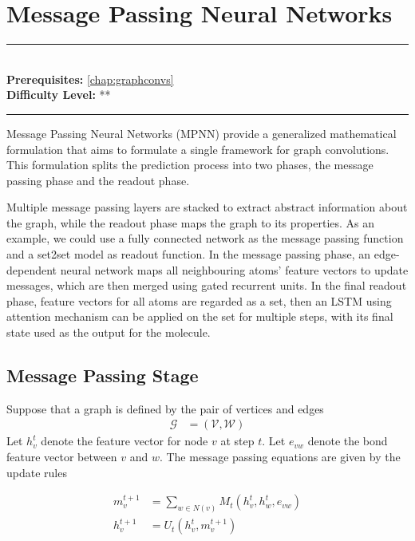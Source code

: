 \documentclass[book.tex]{subfiles}
\begin{document}
\chapter{Message Passing Neural Networks}

\label{chap:mpnn}
\noindent\rule{11cm}{0.4pt} \\
\textbf{Prerequisites:} \autoref{chap:graphconvs} \\
\textbf{Difficulty Level:} ** \\
\noindent\rule{11cm}{0.4pt}
\vspace{5mm}

Message Passing Neural Networks (MPNN) provide a generalized mathematical formulation \cite{gilmer2017neural} that aims to formulate a single framework for graph convolutions. This formulation splits the prediction process into two phases, the message passing phase and the readout phase. 

Multiple message passing layers are stacked to extract abstract information about the graph, while  the readout phase maps the graph to its properties. As an example, we could use a fully connected network as the message passing function and a set2set model as readout function. In the message passing phase, an edge-dependent neural network maps all neighbouring atoms' feature vectors to update messages, which are then merged using gated recurrent units. In the final readout phase, feature vectors for all atoms are regarded as
a set, then an LSTM using attention mechanism can be applied on the set for multiple steps, with its final state used as the output for the molecule.


\section{Message Passing Stage}

Suppose that a graph is defined by the pair of vertices and edges
\begin{align}
\mathcal{G} &= (\mathcal{V}, \mathcal{W})
\end{align}
Let $h_v^t$ denote the feature vector for node $v$ at step $t$. Let $e_{vw}$ denote the bond feature vector between $v$ and $w$. The message passing equations are given by the update rules

\begin{align}
    m^{t+1}_v &= \sum_{w \in N(v)} M_t(h^t_v, h^t_w, e_{vw}) \\
    h^{t+1}_v &= U_t(h^t_v, m^{t+1}_v)
\end{align}
\end{document}

